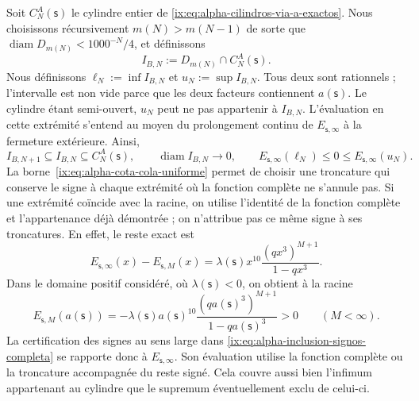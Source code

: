 Soit \(C_N^A(\mathsf s)\) le cylindre entier de \eqref{ix:eq:alpha-cilindros-via-a-exactos}. Nous choisissons récursivement \(m(N)>m(N-1)\) de sorte que \(\operatorname{diam}D_{m(N)}<1000^{-N}/4\), et définissons
\begin{equation}
I_{B,N}:=D_{m(N)}\cap C_N^A(\mathsf s).
 \label{ix:eq:alpha-intervalos-b-completos}
\end{equation}
Nous définissons
\(\ell_N:=\inf I_{B,N}\) et \(u_N:=\sup I_{B,N}\). Tous deux sont rationnels ;
l'intervalle est non vide parce que les deux facteurs contiennent
\(a(\mathsf s)\). Le cylindre étant semi-ouvert, \(u_N\) peut ne pas
appartenir à \(I_{B,N}\). L'évaluation en cette extrémité s'entend au moyen
du prolongement continu de \(E_{\mathsf s,\infty}\) à la fermeture extérieure. Ainsi,
\begin{equation}
 I_{B,N+1}\subseteq I_{B,N}\subseteq C_N^A(\mathsf s),
 \qquad \operatorname{diam}I_{B,N}\longrightarrow0,
 \qquad E_{\mathsf s,\infty}(\ell_N)\leq0\leq
 E_{\mathsf s,\infty}(u_N).
 \label{ix:eq:alpha-inclusion-signos-completa}
\end{equation}
La borne~\eqref{ix:eq:alpha-cota-cola-uniforme} permet de choisir une
troncature qui conserve le signe à chaque extrémité où la fonction complète
ne s'annule pas. Si une extrémité coïncide avec la racine, on utilise l'identité de
la fonction complète et l'appartenance déjà démontrée ; on n'attribue pas ce même
signe à ses troncatures. En effet, le reste exact est
\[
 E_{\mathsf s,\infty}(x)-E_{\mathsf s,M}(x)
 =\lambda(\mathsf s)x^{10}
   \frac{(qx^3)^{M+1}}{1-qx^3}.
\]
Dans le domaine positif considéré, où \(\lambda(\mathsf s)<0\), on obtient à la racine
\[
 E_{\mathsf s,M}(a(\mathsf s))
 =-\lambda(\mathsf s)a(\mathsf s)^{10}
   \frac{(qa(\mathsf s)^3)^{M+1}}{1-qa(\mathsf s)^3}>0
 \qquad(M<\infty).
\]
La certification des signes au sens large dans \eqref{ix:eq:alpha-inclusion-signos-completa} se rapporte donc à \(E_{\mathsf s,\infty}\). Son évaluation utilise la fonction complète ou la troncature accompagnée du reste signé. Cela couvre aussi bien l'infimum appartenant au cylindre que le supremum éventuellement exclu de celui-ci.


